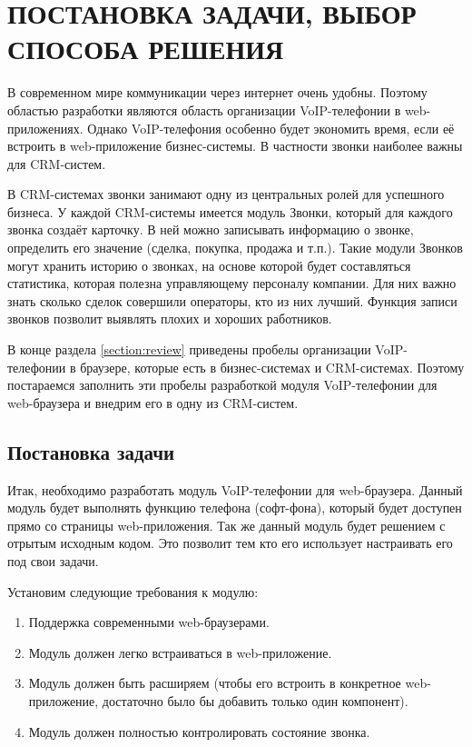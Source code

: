 \chapter{ПОСТАНОВКА ЗАДАЧИ, ВЫБОР СПОСОБА РЕШЕНИЯ}

В современном мире коммуникации через интернет очень удобны. Поэтому областью разработки являются область организации VoIP-телефонии в web-приложениях. Однако VoIP-телефония особенно будет экономить время, если её встроить в web-приложение бизнес-системы. В частности звонки наиболее важны для CRM-систем.

В CRM-системах звонки занимают одну из центральных ролей для успешного бизнеса. У каждой CRM-системы имеется модуль Звонки, который для каждого звонка создаёт карточку. В ней можно записывать информацию о звонке, определить его значение (сделка, покупка, продажа и т.п.). Такие модули Звонков могут хранить историю о звонках, на основе которой будет составляться статистика, которая полезна управляющему персоналу компании. Для них важно знать сколько сделок совершили операторы, кто из них лучший. Функция записи звонков позволит выявлять плохих и хороших работников.

В конце раздела \ref{section:review} приведены пробелы организации VoIP-телефонии в браузере, которые есть в бизнес-системах и CRM-системах. Поэтому постараемся заполнить эти пробелы разработкой модуля VoIP-телефонии для web-браузера и внедрим его в одну из CRM-систем.

\section{Постановка задачи}

Итак, необходимо разработать модуль VoIP-телефонии для web-браузера. Данный модуль будет выполнять функцию телефона (софт-фона), который будет доступен прямо со страницы web-приложения. Так же данный модуль будет решением с отрытым исходным кодом. Это позволит тем кто его использует настраивать его под свои задачи.

Установим следующие требования к модулю:
\begin{enumerate}
\item Поддержка современными web-браузерами.
\item Модуль должен легко встраиваться в web-приложение.
\item Модуль должен быть расширяем (чтобы его встроить в конкретное web-приложение, достаточно было бы добавить только один компонент).
\item Модуль должен полностью контролировать состояние звонка.
\end{enumerate}

